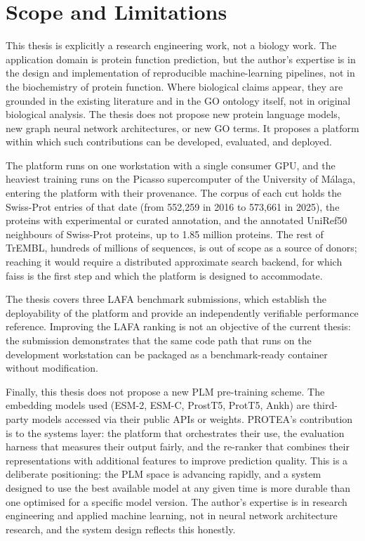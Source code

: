 \section{Scope and Limitations}
\label{sec:scope}

This thesis is explicitly a research engineering work, not a biology work. The
application domain is protein function prediction, but the author's expertise is in
the design and implementation of reproducible machine-learning pipelines, not in the
biochemistry of protein function. Where biological claims appear, they are grounded in
the existing literature and in the GO ontology itself, not in original biological
analysis. The thesis does not propose new protein language models, new graph neural
network architectures, or new GO terms. It proposes a platform within which such
contributions can be developed, evaluated, and deployed.

The platform runs on one workstation with a single consumer GPU, and the heaviest
training runs on the Picasso supercomputer of the University of M\'{a}laga, entering the
platform with their provenance. The corpus of each cut holds the Swiss-Prot entries of
that date (from 552,259 in 2016 to 573,661 in 2025), the proteins with experimental or
curated annotation, and the annotated UniRef50 neighbours of Swiss-Prot proteins, up to
1.85 million proteins. The rest of TrEMBL, hundreds of millions of sequences, is out of
scope as a source of donors; reaching it would require a distributed approximate
search backend, for which \gls{faiss} is the first step and which the platform is
designed to accommodate.

The thesis covers three LAFA benchmark submissions, which establish the deployability
of the platform and provide an independently verifiable performance reference.
Improving the LAFA ranking is not an objective of the current thesis: the submission
demonstrates that the same code path that runs on the development workstation can be
packaged as a benchmark-ready container without modification.

Finally, this thesis does not propose a new PLM pre-training scheme. The embedding
models used (ESM-2, ESM-C, ProstT5, ProtT5, Ankh) are third-party models accessed
via their public APIs or weights. PROTEA's contribution is to the systems layer: the
platform that orchestrates their use, the evaluation harness that measures their
output fairly, and the re-ranker that combines their representations with additional
features to improve prediction quality. This is a deliberate positioning: the PLM
space is advancing rapidly, and a system designed to use the best available model at
any given time is more durable than one optimised for a specific model version.
The author's expertise is in research engineering and applied machine learning, not
in neural network architecture research, and the system design reflects this honestly.

